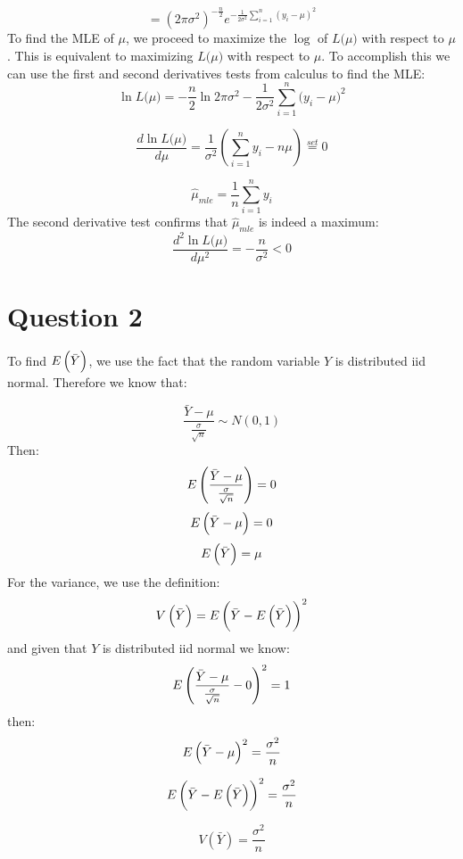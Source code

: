 \documentclass[12pt,a4paper]{report}
\begin{document}
\[
= \left(2 \pi \sigma^2\right)^{-\frac{n}{2}} e^{-\frac{1}{2 \sigma^2}\sum_{i=1}^n(y_i-\mu)^2}
\]
To find the MLE of $\mu$, we proceed to maximize the $\log$ of $L\big(\mu\big)$ with respect to $\mu$. This is equivalent to maximizing $L\big(\mu\big)$ with respect to $\mu$. To accomplish this we can use the first and second derivatives tests from calculus to find the MLE:
\[
\ln{L\big(\mu\big)}=-\frac{n}{2}\ln{2 \pi \sigma^2}-\frac{1}{2 \sigma^2}\sum_{i=1}^n \big(y_i - \mu\big)^2
\]

\[
\frac{d \ln{L\big(\mu\big)}}{d\mu}=\frac{1}{\sigma^2}\left(\sum_{i=1}^n y_i - n \mu \right)\overset{set}{=}0
\]

\[
\hat{\mu}_{mle}=\frac{1}{n}\sum_{i=1}^n y_i
\]
The second derivative test confirms that $\hat{\mu}_{mle}$ is indeed a maximum:
\[
\frac{d^2 \ln{L\big(\mu\big)}}{d\mu^2}=-\frac{n}{\sigma^2}<0
\]
\clearpage
\section*{Question 2}
To find $E \left(\bar{Y}\right)$, we use the fact that the random variable $Y$ is distributed iid normal. Therefore we know that:

\[
\dfrac{\bar{Y}-\mu}{\frac{\sigma}{\sqrt{n}}} \sim N(0,1)
\]
Then:
\[
E \left(\dfrac{\bar{Y}-\mu}{\frac{\sigma}{\sqrt{n}}}\right)=0
\]
\[
E \left(\bar{Y}-\mu\right)=0
\]
\[
E \left(\bar{Y}\right)=\mu
\]
For the variance, we use the definition:
\[
V\left(\bar{Y}\right)=E \left(\bar{Y}-E \left(\bar{Y}\right)\right)^2
\]
and given that $Y$ is distributed iid normal we know:
\[
E \left(\dfrac{\bar{Y}-\mu}{\frac{\sigma}{\sqrt{n}}}-0\right)^2=1
\]
then:
\[
E \left(\bar{Y}-\mu\right)^2 = \dfrac{\sigma^2}{n}
\]

\[
E \left(\bar{Y}-E \left(\bar{Y}\right)\right)^2 = \dfrac{\sigma^2}{n}
\]

\[
V\left(\bar{Y}\right) = \dfrac{\sigma^2}{n}
\]
\clearpage
\end{document}
